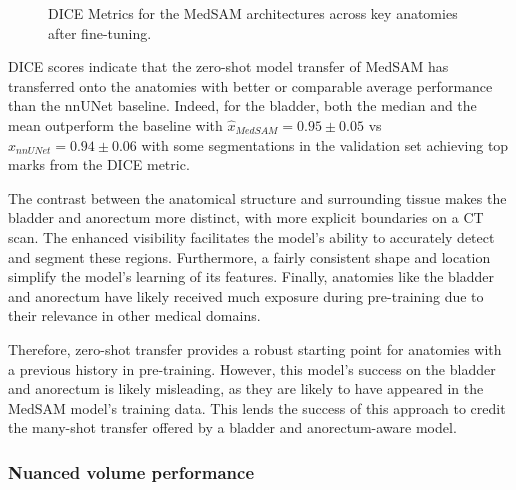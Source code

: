 \documentclass[11pt,twoside]{report}
\begin{document}
\begin{figure}[H]
  \centering
  \vspace*{1em}
  \caption{DICE Metrics for the MedSAM architectures across key anatomies after fine-tuning.}\label{fig:medsam-finetune-dice}
\end{figure}

DICE scores indicate that the zero-shot model transfer of MedSAM has transferred onto the anatomies with better or comparable average performance than the nnUNet baseline. Indeed, for the bladder, both the median and the mean outperform the baseline with $\hat{x}_{MedSAM} = 0.95 \pm 0.05$ vs $\hat{x}_{nnUNet} = 0.94 \pm 0.06$ with some segmentations in the validation set achieving top marks from the DICE metric. 

The contrast between the anatomical structure and surrounding tissue makes the bladder and anorectum more distinct, with more explicit boundaries on a CT scan. The enhanced visibility facilitates the model's ability to accurately detect and segment these regions. Furthermore, a fairly consistent shape and location simplify the model's learning of its features. Finally, anatomies like the bladder and anorectum have likely received much exposure during pre-training due to their relevance in other medical domains.

Therefore, zero-shot transfer provides a robust starting point for anatomies with a previous history in pre-training. However, this model's success on the bladder and anorectum is likely misleading, as they are likely to have appeared in the MedSAM model's training data. This lends the success of this approach to credit the many-shot transfer offered by a bladder and anorectum-aware model.

\subsubsection{Nuanced volume performance}
\end{document}
